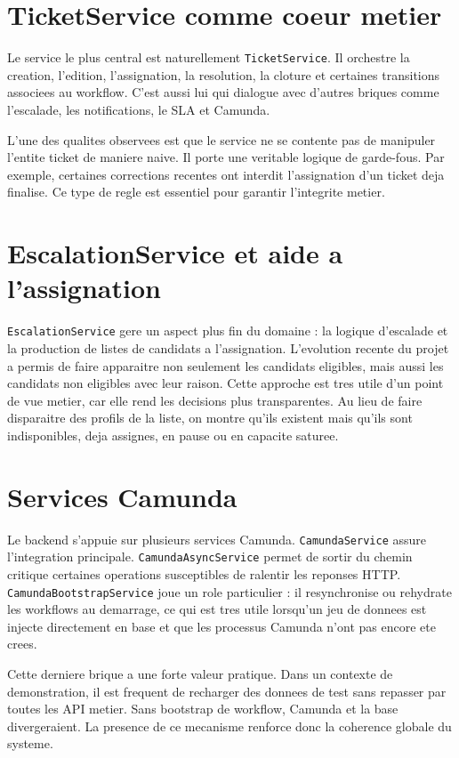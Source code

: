 \documentclass[12pt,a4paper,oneside]{report}
\begin{document}
\section{TicketService comme coeur metier}

Le service le plus central est naturellement \texttt{TicketService}. Il orchestre la creation, l'edition, l'assignation, la resolution, la cloture et certaines transitions associees au workflow. C'est aussi lui qui dialogue avec d'autres briques comme l'escalade, les notifications, le SLA et Camunda.

L'une des qualites observees est que le service ne se contente pas de manipuler l'entite ticket de maniere naive. Il porte une veritable logique de garde-fous. Par exemple, certaines corrections recentes ont interdit l'assignation d'un ticket deja finalise. Ce type de regle est essentiel pour garantir l'integrite metier.

\section{EscalationService et aide a l'assignation}

\texttt{EscalationService} gere un aspect plus fin du domaine : la logique d'escalade et la production de listes de candidats a l'assignation. L'evolution recente du projet a permis de faire apparaitre non seulement les candidats eligibles, mais aussi les candidats non eligibles avec leur raison. Cette approche est tres utile d'un point de vue metier, car elle rend les decisions plus transparentes. Au lieu de faire disparaitre des profils de la liste, on montre qu'ils existent mais qu'ils sont indisponibles, deja assignes, en pause ou en capacite saturee.

\section{Services Camunda}

Le backend s'appuie sur plusieurs services Camunda. \texttt{CamundaService} assure l'integration principale. \texttt{CamundaAsyncService} permet de sortir du chemin critique certaines operations susceptibles de ralentir les reponses HTTP. \texttt{CamundaBootstrapService} joue un role particulier : il resynchronise ou rehydrate les workflows au demarrage, ce qui est tres utile lorsqu'un jeu de donnees est injecte directement en base et que les processus Camunda n'ont pas encore ete crees.

Cette derniere brique a une forte valeur pratique. Dans un contexte de demonstration, il est frequent de recharger des donnees de test sans repasser par toutes les API metier. Sans bootstrap de workflow, Camunda et la base divergeraient. La presence de ce mecanisme renforce donc la coherence globale du systeme.
\end{document}
